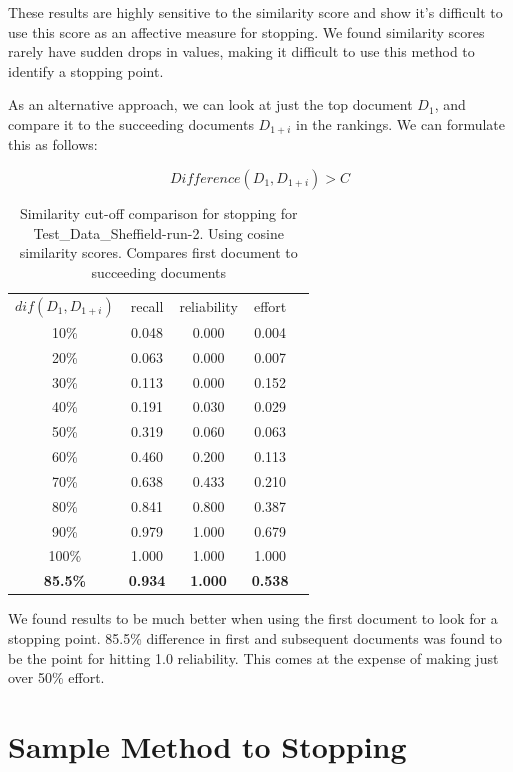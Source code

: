 These results are highly sensitive to the similarity score and show it's difficult to use this score as an affective measure for stopping. We found similarity scores rarely have sudden drops in values, making it difficult to use this method to identify a stopping point.

As an alternative approach, we can look at just the top document $D_1$, and compare it to the succeeding documents $D_{1+i}$ in the rankings. We can formulate this as follows:

\begin{equation}
	  Difference(D_1, D_{1 + i}) > C
\end{equation}

\begin{table}[H]
\centering
\begin{tabular}{|c|c|c|c|c|} 
\hline
 $dif(D_1, D_{1+i})$ & recall & reliability & effort  \\ 
 10\% & 0.048 &	0.000	&	0.004 \\ 
 20\% & 0.063 &	0.000	&	0.007 \\ 
 30\% & 0.113 &	0.000	&	0.152 \\ 
 40\% & 0.191 &	0.030	&	0.029 \\ 
 50\% & 0.319 &	0.060	&	0.063 \\
 60\% & 0.460 &	0.200	&	0.113 \\ 
 70\% & 0.638 &	0.433	&	0.210 \\ 
 80\% & 0.841 &	0.800	&	0.387 \\ 
 90\% & 0.979 &	1.000	&	0.679 \\ 
 100\% &1.000 &	1.000	&	1.000 \\  
 \textbf{85.5\%} & \textbf{0.934} &	\textbf{1.000}	&	\textbf{0.538} \\  
 \hline
\end{tabular}

\caption{Similarity cut-off comparison for stopping for Test\_Data\_Sheffield-run-2. Using cosine similarity scores. Compares first document to succeeding documents}
\end{table}

We found results to be much better when using the first document to look for a stopping point. 85.5\% difference in first and subsequent documents was found to be the point for hitting 1.0 reliability. This comes at the expense of making just over 50\% effort.

\section{Sample Method to Stopping} \label{samplemethods}

